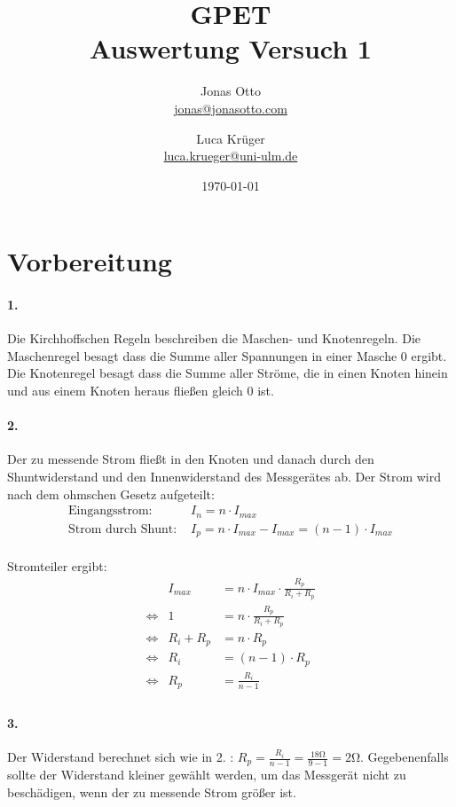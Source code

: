 \documentclass[a4paper]{article}
\title{GPET\\ Auswertung Versuch 1}
\author{Jonas Otto\\ \href{mailto:jonas@jonasotto.com}{jonas@jonasotto.com} 
   \and Luca Krüger \\ \href{mailto:luca.krueger@uni-ulm.de}{luca.krueger@uni-ulm.de} }
\date{\today}
\begin{document}
\maketitle

\section{Vorbereitung}
    \paragraph{1.}
    Die Kirchhoffschen Regeln beschreiben die Maschen- und Knotenregeln. Die Maschenregel besagt dass die Summe aller Spannungen in einer Masche $0$ ergibt. Die Knotenregel besagt dass die Summe aller Ströme, die in einen Knoten hinein und aus einem Knoten heraus fließen gleich $0$ ist.
    
    \paragraph{2.}
    Der zu messende Strom fließt in den Knoten und danach durch den Shuntwiderstand und den Innenwiderstand des Messgerätes ab. Der Strom wird nach dem ohmschen Gesetz aufgeteilt:
    \begin{eqnarray*}
        \text{Eingangsstrom: }& I_n=n\cdot I_{max}\\
        \text{Strom durch Shunt: }& I_p=n\cdot I_{max}-I_{max} = (n-1) \cdot I_{max}\\
    \end{eqnarray*}
    
    Stromteiler ergibt:
    \begin{eqnarray*}
            &I_{max}&=n\cdot I_{max} \cdot \frac{R_p}{R_i+R_p}\\
        \iff& 1&=n \cdot \frac{R_p}{R_i+R_p}\\
        \iff& R_i+R_p&=n \cdot {R_p}\\
        \iff& R_i&=(n-1) \cdot {R_p}\\
        \iff& R_p&=\frac{R_i}{n-1}\\
    \end{eqnarray*}
    
    \paragraph{3.}
    Der Widerstand berechnet sich wie in 2. : $ R_p=\frac{R_i}{n-1} = \frac{18\si{\ohm}}{9-1} = 2\si{\ohm}$. Gegebenenfalls sollte der Widerstand kleiner gewählt werden, um das Messgerät nicht zu beschädigen, wenn der zu messende Strom größer ist.
    
\end{document}
